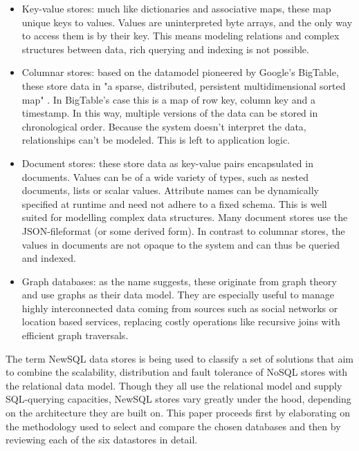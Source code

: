 \documentclass{IEEEtran}
\begin{document}
\begin{itemize}
\item Key-value stores: much like dictionaries and associative maps, these map unique keys to values. Values are uninterpreted byte arrays, and the only way to access them is by their key. This means modeling relations and complex structures between data, rich querying and indexing is not possible\cite{hecht2011nosql}\cite{grolinger2013data}. 
\item Columnar stores: based on the datamodel pioneered by Google's BigTable, these store data in "a sparse, distributed, persistent multidimensional sorted map" \cite{chang2008bigtable}. In BigTable's case this is a map of row key, column key and a timestamp. In this way, multiple versions of the data can be stored in chronological order. Because the system doesn't interpret the data, relationships can't be modeled. This is left to application logic\cite{hecht2011nosql}.
\item Document stores: these store data as key-value pairs encapsulated in documents. Values can be of a wide variety of types, such as nested documents, lists or scalar values. Attribute names can be dynamically specified at runtime and need not adhere to a fixed schema\cite{cattell2011scalable}. This is well suited for modelling complex data structures. Many document stores use the JSON-fileformat (or some derived form). In contrast to columnar stores, the values in documents are not opaque to the system and can thus be queried and indexed\cite{hecht2011nosql}.
\item Graph databases: as the name suggests, these originate from graph theory and use graphs as their data model. They are especially useful to manage highly interconnected data coming from sources such as social networks or location based services, replacing costly operations like recursive joins with efficient graph traversals\cite{hecht2011nosql}.
\end{itemize}
The term NewSQL data stores is being used to classify a set of solutions that aim to combine the scalability, distribution and fault tolerance of NoSQL stores with the relational data model. Though they all use the relational model and supply SQL-querying capacities, NewSQL stores vary greatly under the hood, depending on the architecture they are built on\cite{grolinger2013data}. This paper proceeds first by elaborating on the methodology used to select and compare the chosen databases and then by reviewing each of the six datastores in detail.
\end{document}
